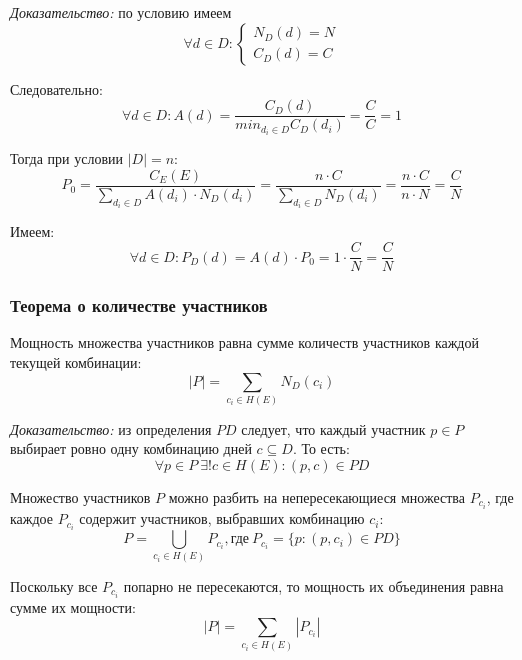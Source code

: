 \textit{Доказательство:} по условию имеем
\begin{equation}
	\forall d \in D:
	\begin{cases}
		N_D(d) = N \\
		C_D(d) = C
	\end{cases}
\end{equation}

Следовательно:
\begin{equation}
	\forall d \in D: A(d) = \frac{C_D(d)}{min_{d_i \in D}{C_D(d_i)}} = \frac{C}{C} = 1
\end{equation}

Тогда при условии $|D| = n$:
\begin{equation}
	P_0 = \frac{C_E(E)}{\sum_{d_i \in D}{A(d_i) \cdot N_D(d_i)}} = \frac{n \cdot C}{\sum_{d_i \in D}{N_D(d_i)}} = \frac{n \cdot C}{n \cdot N} = \frac{C}{N}
\end{equation}

Имеем:
\begin{equation}
	\forall d \in D: P_D(d) = A(d) \cdot P_0 = 1 \cdot \frac{C}{N} = \frac{C}{N}
\end{equation}

\subsubsection{Теорема о количестве участников}

Мощность множества участников равна сумме количеств участников каждой текущей комбинации:
\begin{equation}
	|P| = \sum_{c_i \in H(E)}{N_D(c_i)}
\end{equation}

\textit{Доказательство:} из определения $PD$ следует, что каждый участник $p \in P$ выбирает ровно одну комбинацию дней $c \subseteq D$. То есть:
\begin{equation}
	\forall p \in P \ \exists! c \in H(E): (p, c) \in PD
\end{equation}

Множество участников $P$ можно разбить на непересекающиеся множества $P_{c_i}$, где каждое $P_{c_i}$ содержит участников, выбравших комбинацию $c_i$:
\begin{equation}
	P = \bigcup_{c_i \in H(E)}{P_{c_i}}, \text{где} \ P_{c_i} = \{p: (p, c_i) \in PD\}
\end{equation}

Поскольку все $P_{c_i}$ попарно не пересекаются, то мощность их объединения равна сумме их мощности:
\begin{equation}
	|P| = \sum_{c_i \in H(E)}{|P_{c_i}|}
\end{equation}

